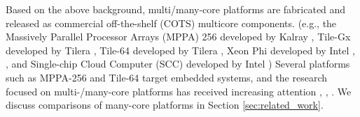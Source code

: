 


Based on the above background, multi/many-core platforms are fabricated and released as commercial off-the-shelf (COTS) multicore components.
(e.g., the Massively Parallel Processor Arrays (MPPA) 256 developed by Kalray \cite{de2014time}, Tile-Gx developed by Tilera \cite{ramey2011tile} \cite{schooler2010tile}, Tile-64 developed by Tilera \cite{bell2008tile64}, Xeon Phi developed by Intel \cite{chrysos2014intel}, \cite{chrysos2012intel}, and Single-chip Cloud Computer (SCC) developed by Intel \cite{baron2010single})
Several platforms such as MPPA-256 and Tile-64 target embedded systems, and the research focused on multi-/many-core platforms has received increasing attention \cite{kanter2015kalray}, \cite{denet2017work}, \cite{perret2016predictable}.
We discuss comparisons of many-core platforms in Section \ref{sec:related_work}.  

